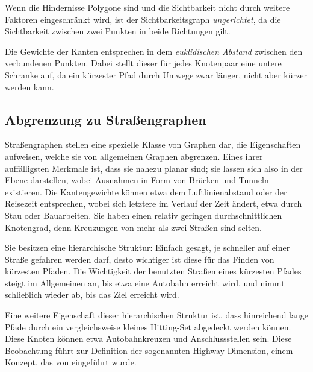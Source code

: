 Wenn die Hindernisse Polygone sind und die Sichtbarkeit nicht durch weitere Faktoren eingeschränkt wird, ist der Sichtbarkeitsgraph \emph{ungerichtet}, da die Sichtbarkeit zwischen zwei Punkten in beide Richtungen gilt.

Die Gewichte der Kanten entsprechen in dem \emph{euklidischen Abstand} zwischen den verbundenen Punkten.
Dabei stellt dieser für jedes Knotenpaar eine untere Schranke auf, da ein kürzester Pfad durch Umwege zwar länger, nicht aber kürzer werden kann.




\subsection{Abgrenzung zu Straßengraphen}\label{graphs:strassengraphen}

Straßengraphen stellen eine spezielle Klasse von Graphen dar, die Eigenschaften aufweisen, welche sie von allgemeinen Graphen abgrenzen.
Eines ihrer auffälligsten Merkmale ist, dass sie nahezu planar sind; sie lassen sich also in der Ebene darstellen, wobei Ausnahmen in Form von Brücken und Tunneln existieren.
Die Kantengewichte können etwa dem Luftlinienabstand oder der Reisezeit entsprechen, wobei sich letztere im Verlauf der Zeit ändert, etwa durch Stau oder Bauarbeiten.
Sie haben einen relativ geringen durchschnittlichen Knotengrad, denn Kreuzungen von mehr als zwei Straßen sind selten.

Sie besitzen eine hierarchische Struktur: Einfach gesagt, je schneller auf einer Straße gefahren werden darf, desto wichtiger ist diese für das Finden von kürzesten Pfaden. Die Wichtigkeit der benutzten Straßen eines kürzesten Pfades steigt im Allgemeinen an, bis etwa eine Autobahn erreicht wird, und nimmt schließlich wieder ab, bis das Ziel erreicht wird.

Eine weitere Eigenschaft dieser hierarchischen Struktur ist, dass hinreichend lange Pfade durch ein vergleichsweise kleines Hitting-Set abgedeckt werden können. Diese Knoten können etwa Autobahnkreuzen und Anschlussstellen sein. Diese Beobachtung führt zur Definition der sogenannten Highway Dimension, einem Konzept, das von \cite{abraham2010highway} eingeführt wurde.

